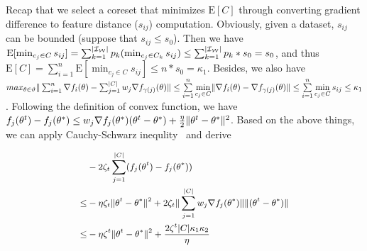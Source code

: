 Recap that we select a coreset that minimizes $\mathrm{E}[C]$ through converting gradient difference to feature distance ($s_{ij}$) computation. Obviously, given a dataset, $s_{ij}$ can be bounded (suppose that $s_{ij} \leq s_{0}$). Then we have
$\mathrm{E}[\min_{c_j\in C}s_{ij}] = \sum_{k= 1}^{|\mathcal{I_W}|} p_k (\min_{c_j\in C_k}s_{ij}) \leq \sum_{k= 1}^{|\mathcal{I_W}|} p_k * s_{0} = s_{0}$, and thus  $\mathrm{E}[C] = \sum_{i=1}^n \mathrm{E}[\min_{c_j\in C}s_{ij}] \leq n * s_{0} = \kappa_1$. Besides, we also have $max_{\theta \in \vartheta} \Vert \sum_{i=1}^{n} \nabla f_{i}(\theta) - \sum_{j=1}^{\vert C \vert} w_j \nabla f_{\gamma(j)}(\theta) \Vert \leq \sum\limits_{i=1}^n \min \limits_{c_j\in C}\lVert \nabla f_i(\theta) - \nabla f_{\gamma(j)}(\theta) \rVert \leq \sum\limits_{i=1}^n \min \limits_{c_j\in C} s_{ij}  \leq \kappa_1$.
Following the definition of  convex function,  we have $f_{j}(\theta^{t}) - f_{j}(\theta^{*}) \leq w_j \nabla f_{j}(\theta^{*})(\theta^{t} - \theta^{*}) + \frac{\eta}{2} \Vert \theta^{t} - \theta^{*} \Vert^{2}$. Based on the above things, we can apply Cauchy-Schwarz inequlity~\cite{strang2006linear} and derive  

\vspace{-1em}
\begin{equation}
	\label{eq:item1}
	\small
	\begin{aligned}
		& - 2 \zeta_{t} \sum_{j=1}^{\vert C \vert} (f_{j}(\theta^{t}) - f_{j}(\theta^{*}))  \\
		\le &  - \eta \zeta_{t} \Vert \theta^{t} - \theta^{*} \Vert^{2} + 2 \zeta_{t} \Vert \sum_{j=1}^{\vert C \vert} w_j \nabla f_{j}(\theta^{*}) \Vert \Vert (\theta^{t} - \theta^{*}) \Vert \\
		\le & - \eta \zeta^{t} \Vert \theta^{t} - \theta^{*} \Vert^{2} + \frac{2 \zeta^{t} \vert C \vert \kappa_1 \kappa_2}{\eta}  
	\end{aligned}
\end{equation}

